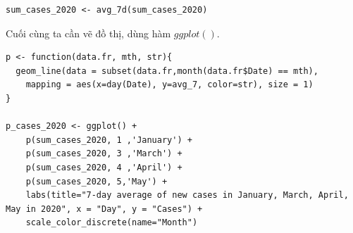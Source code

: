 \documentclass[a4paper]{article}
\theoremstyle{definition}
\begin{document}
\begin{enumerate}[1)]
\begin{lstlisting}
sum_cases_2020 <- avg_7d(sum_cases_2020)
    \end{lstlisting}
    
    Cuối cùng ta cần vẽ đồ thị, dùng hàm $ggplot()$.
    \begin{lstlisting}
p <- function(data.fr, mth, str){
  geom_line(data = subset(data.fr,month(data.fr$Date) == mth), 
    mapping = aes(x=day(Date), y=avg_7, color=str), size = 1)
}

p_cases_2020 <- ggplot() + 
    p(sum_cases_2020, 1 ,'January') + 
    p(sum_cases_2020, 3 ,'March') + 
    p(sum_cases_2020, 4 ,'April') + 
    p(sum_cases_2020, 5,'May') + 
    labs(title="7-day average of new cases in January, March, April, May in 2020", x = "Day", y = "Cases") + 
    scale_color_discrete(name="Month")
    \end{lstlisting}
    

\end{enumerate}
\end{document}
